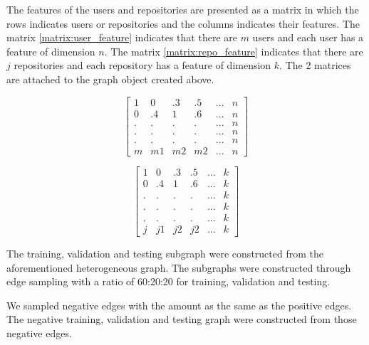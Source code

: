 \documentclass[11pt,twoside]{report}
\begin{document}
The features of the users and repositories are presented as a matrix in which the rows indicates users or repositories and the columns indicates their features. The matrix \ref{matrix:user_feature} indicates that there are $m$ users and each user has a feature of dimension $n$. The matrix \ref{matrix:repo_feature} indicates that there are $j$ repositories and each repository has a feature of dimension $k$. The 2 matrices are attached to the graph object created above.

\begin{equation}
    \begin{bmatrix}
        1 & 0 & .3 & .5 & ... & n \\
        0 & .4 & 1 & .6 & ... & n \\
        . & . & . & . & ... & n \\
        . & . & . & . & ... & n \\
        . & . & . & . & ... & n \\
        m & m1 & m2 & m2 & ... & n
        \label{matrix:user_feature}
    \end{bmatrix}
\end{equation}

\begin{equation}
    \begin{bmatrix}
        1 & 0 & .3 & .5 & ... & k \\
        0 & .4 & 1 & .6 & ... & k \\
        . & . & . & . & ... & k \\
        . & . & . & . & ... & k \\
        . & . & . & . & ... & k \\
        j & j1 & j2 & j2 & ... & k
        \label{matrix:repo_feature}
    \end{bmatrix}
\end{equation}

The training, validation and testing subgraph were constructed from the aforementioned heterogeneous graph. The subgraphs were constructed through edge sampling with a ratio of 60:20:20 for training, validation and testing.

We sampled negative edges with the amount as the same as the positive edges. The negative training, validation and testing graph were constructed from those negative edges.
\end{document}
